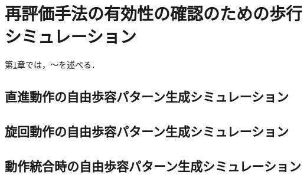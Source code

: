 ﻿%

\chapter{再評価手法の有効性の確認のための歩行シミュレーション}\label{chapter:再評価手法の有効性の確認のための歩行シミュレーション}
第\ref{chapter:再評価手法の有効性の確認のための歩行シミュレーション}章では，～を述べる．

\section{直進動作の自由歩容パターン生成シミュレーション}

\section{旋回動作の自由歩容パターン生成シミュレーション}

\section{動作統合時の自由歩容パターン生成シミュレーション}